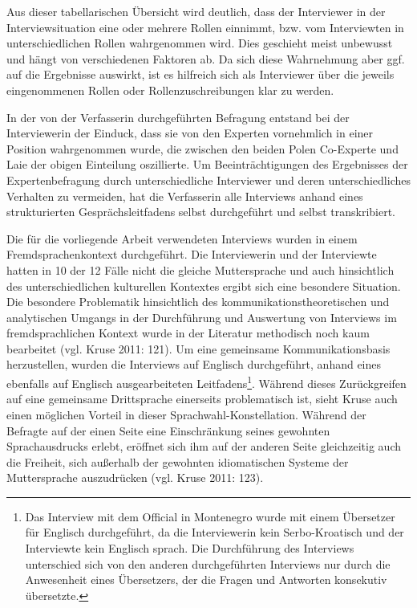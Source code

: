 Aus dieser tabellarischen Übersicht wird deutlich, dass der Interviewer in der Interviewsituation eine oder mehrere Rollen einnimmt, bzw. vom Interviewten in unterschiedlichen Rollen wahrgenommen wird. Dies geschieht meist unbewusst und hängt von verschiedenen Faktoren ab. Da sich diese Wahrnehmung aber ggf. auf die Ergebnisse auswirkt, ist es hilfreich sich als Interviewer über die jeweils eingenommenen Rollen oder Rollenzuschreibungen klar zu werden. \par
In der von der Verfasserin durchgeführten Befragung entstand bei der Interviewerin der Einduck, dass sie von den Experten vornehmlich in einer Position wahrgenommen wurde, die zwischen den beiden Polen Co-Experte und Laie der obigen Einteilung oszillierte. Um Beeinträchtigungen des Ergebnisses der Expertenbefragung durch unterschiedliche Interviewer und deren unterschiedliches Verhalten zu vermeiden, hat die Verfasserin alle Interviews anhand eines strukturierten Gesprächsleitfadens selbst durchgeführt und selbst transkribiert.\par
Die für die vorliegende Arbeit verwendeten Interviews wurden in einem Fremdsprachenkontext durchgeführt. Die Interviewerin und der Interviewte hatten in 10 der 12 Fälle nicht die gleiche Muttersprache und auch hinsichtlich des unterschiedlichen kulturellen Kontextes ergibt sich eine besondere Situation. Die besondere Problematik hinsichtlich des kommunikationstheoretischen und analytischen Umgangs in der Durchführung und Auswertung von Interviews im fremdsprachlichen Kontext wurde in der Literatur methodisch noch kaum bearbeitet (vgl. Kruse 2011: 121). Um eine gemeinsame Kommunikationsbasis herzustellen, wurden die Interviews auf Englisch durchgeführt, anhand eines ebenfalls auf Englisch ausgearbeiteten Leitfadens\footnote{Das Interview mit dem Official in Montenegro wurde mit einem Übersetzer für Englisch durchgeführt, da die Interviewerin kein Serbo-Kroatisch und der Interviewte kein Englisch sprach. Die Durchführung des Interviews unterschied sich von den anderen durchgeführten Interviews nur durch die Anwesenheit eines Übersetzers, der die Fragen und Antworten konsekutiv übersetzte.}. Während dieses Zurückgreifen auf eine gemeinsame Drittsprache einerseits problematisch ist, sieht Kruse auch einen möglichen Vorteil in dieser Sprachwahl-Konstellation. Während der Befragte auf der einen Seite eine Einschränkung seines gewohnten Sprachausdrucks erlebt, eröffnet sich ihm auf der anderen Seite gleichzeitig auch die Freiheit, sich außerhalb der gewohnten idiomatischen Systeme der Muttersprache auszudrücken (vgl. Kruse 2011: 123). \par

